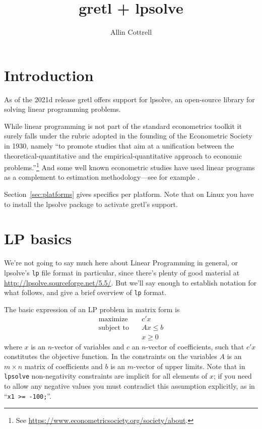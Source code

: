 \documentclass{article}
\begin{document}
\setlength{\parindent}{0pt}
\setlength{\parskip}{1ex}
\setcounter{secnumdepth}{1}

\newenvironment{funcdoc}
{\noindent\hrulefill\\[-10pt]}
{\medskip}

\newcommand{\argname}[1]{\textsl{#1}}

\title{gretl + lpsolve}
\author{Allin Cottrell}
\maketitle

\section{Introduction}
\label{sec:intro}

As of the 2021d release gretl offers support for \textsf{lpsolve}, an
open-source library for solving linear programming
problems.

While linear programming is not part of the standard econometrics
toolkit it surely falls under the rubric adopted in the founding of
the Econometric Society in 1930, namely ``to promote studies that aim
at a unification between the theoretical-quantitative and the
empirical-quantitative approach to economic problems.''\footnote{See
  \url{https://www.econometricsociety.org/society/about}.} And
some well known econometric studies have used linear programs as a
complement to estimation methodology---see for example
\cite{ferrier-lovell90}.

Section~\ref{sec:platforms} gives specifics per platform. Note that on
Linux you have to install the \textsf{lpsolve} package to activate
gretl's support.

\section{LP basics}
\label{sec:basics}

We're not going to say much here about Linear Programming in general,
or \textsf{lpsolve}'s \texttt{lp} file format in particular, since
there's plenty of good material at
\url{http://lpsolve.sourceforge.net/5.5/}. But we'll say enough to
establish notation for what follows, and give a brief overview of
\texttt{lp} format.

The basic expression of an LP problem in matrix form is
\begin{align*}
  \mbox{maximize} & \quad c'x \\
  \mbox{subject to} & \quad Ax \leq b \\
  & \quad x \geq 0
\end{align*}
where $x$ is an $n$-vector of variables and $c$ an $n$-vector of
coefficients, such that $c'x$ constitutes the objective function. In
the constraints on the variables $A$ is an $m\times n$ matrix of
coefficients and $b$ is an $m$-vector of upper limits. Note that in
\texttt{lpsolve} non-negativity constraints are implicit for all
elements of $x$; if you need to allow any negative values you must
contradict this assumption explicitly, as in ``\texttt{x1 >= -100;}''.
\end{document}
